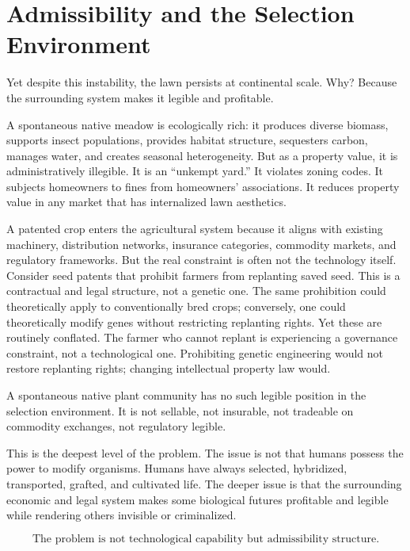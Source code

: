 \documentclass[12pt]{article}
\begin{document}
\section{Admissibility and the Selection Environment}

Yet despite this instability, the lawn persists at continental scale. Why? Because the surrounding system makes it legible and profitable.

A spontaneous native meadow is ecologically rich: it produces diverse biomass, supports insect populations, provides habitat structure, sequesters carbon, manages water, and creates seasonal heterogeneity. But as a property value, it is administratively illegible. It is an ``unkempt yard.'' It violates zoning codes. It subjects homeowners to fines from homeowners' associations. It reduces property value in any market that has internalized lawn aesthetics.

A patented crop enters the agricultural system because it aligns with existing machinery, distribution networks, insurance categories, commodity markets, and regulatory frameworks. But the real constraint is often not the technology itself. Consider seed patents that prohibit farmers from replanting saved seed. This is a contractual and legal structure, not a genetic one. The same prohibition could theoretically apply to conventionally bred crops; conversely, one could theoretically modify genes without restricting replanting rights. Yet these are routinely conflated. The farmer who cannot replant is experiencing a governance constraint, not a technological one. Prohibiting genetic engineering would not restore replanting rights; changing intellectual property law would.

A spontaneous native plant community has no such legible position in the selection environment. It is not sellable, not insurable, not tradeable on commodity exchanges, not regulatory legible.

This is the deepest level of the problem. The issue is not that humans possess the power to modify organisms. Humans have always selected, hybridized, transported, grafted, and cultivated life. The deeper issue is that the surrounding economic and legal system makes some biological futures profitable and legible while rendering others invisible or criminalized.

\begin{equation}
\boxed{\text{The problem is not technological capability but admissibility structure.}}
\end{equation}
\end{document}
